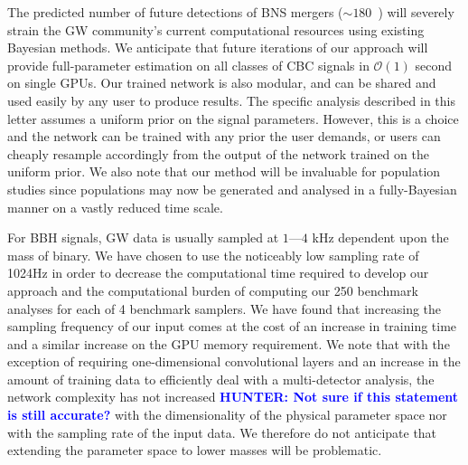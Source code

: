\documentclass[%
showpacs,
nofootinbib,
 amsmath,amssymb,
 aps,
 twocolumn,
 prl,
 reprint,
floatfix,
]{revtex4-1}
\newcommand{\hunter}[1]{\textbf{\textcolor{blue}{HUNTER: #1}}}
\begin{document}
%
%
The predicted number of future detections of \ac{BNS} mergers ($\sim
180$~\cite{2018LRR....21....3A}) will severely strain the \ac{GW} community's
current computational resources using existing Bayesian methods. We anticipate
that future iterations of our approach will provide full-parameter estimation
on all classes of \ac{CBC} signals in $\mathcal{O}(1)$ second on single
\acp{GPU}. Our trained network is also modular, and can be shared and used
easily by any user to produce results. The specific analysis described in this
letter assumes a uniform prior on the signal parameters. However, this is a
choice and the network can be trained with any prior the user demands, or users
can cheaply resample accordingly from the output of the network trained on the
uniform prior. We also note that our method will be invaluable for population
studies since populations may now be generated and analysed in a fully-Bayesian
manner on a vastly reduced time scale. 

%
%
For \ac{BBH} signals, \ac{GW} data is usually sampled at $1$---$4$ kHz
dependent upon the mass of binary. We have chosen to use the noticeably low
sampling rate of 1024Hz in order to decrease the computational time
required to develop our approach and the computational burden of computing our
250 benchmark analyses for each of 4 benchmark samplers.  We have found that 
increasing the sampling frequency of our input comes at the cost of an increase 
in training time and a similar increase on the \ac{GPU} memory
requirement. We note that with the exception of requiring one-dimensional
convolutional layers and an increase in the amount of training data to
efficiently deal with a multi-detector analysis, the network complexity has not
increased \hunter{Not sure if this statement is still accurate?} 
with the dimensionality of the physical parameter space nor with the
sampling rate of the input data. We therefore do not anticipate that extending
the parameter space to lower masses will be problematic. 
\end{document}
